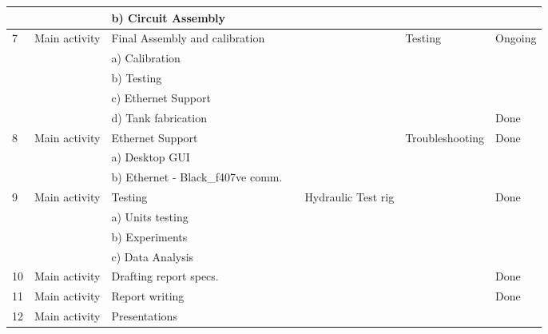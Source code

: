 \begin{landscape}
\begin{table}[H]
{\begin{tabular}{|l|l|l|l|l|l|l|}
   &               & b) Circuit Assembly                 &                       &                    &                       &         \\ \hline
7  & Main activity & Final Assembly and calibration      &                       &                    & Testing               & Ongoing \\ \hline
   &               & a) Calibration                      &                       &                    &                       &         \\ \hline
   &               & b) Testing                          &                       &                    &                       &         \\ \hline
   &               & c) Ethernet Support                 &                       &                    &                       &         \\ \hline
   &               & d) Tank fabrication                 &                       &                    &                       & Done    \\ \hline
8  & Main activity & Ethernet Support                    &                       &                    & Troubleshooting       & Done    \\ \hline
   &               & a) Desktop GUI                      &                       &                    &                       &         \\ \hline
   &               & b) Ethernet - Black\_f407ve comm.   &                       &                    &                       &         \\ \hline
9  & Main activity & Testing                             &                       & Hydraulic Test rig &                       & Done    \\ \hline
   &               & a) Units testing                    &                       &                    &                       &         \\ \hline
   &               & b) Experiments                      &                       &                    &                       &         \\ \hline
   &               & c) Data Analysis                    &                       &                    &                       &         \\ \hline
10 & Main activity & Drafting report specs.              &                       &                    &                       & Done    \\ \hline
11 & Main activity & Report writing                      &                       &                    &                       & Done    \\ \hline
12 & Main activity & Presentations                       &                       &                    &                       &         \\ \hline
\end{tabular}%
}
\end{table}
\end{landscape}


